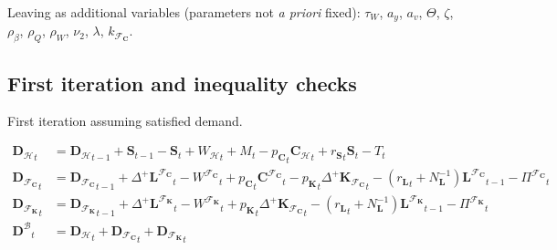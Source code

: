 \documentclass[a4paper, headings=standardclasses]{scrartcl}
\numberwithin{equation}{subsection}
\begin{document}
Leaving as additional variables (parameters not \textit{a priori} fixed): $\tau_W$, $a_y$, $a_v$, $\Theta$, $\zeta$, $\rho_\beta$, $\rho_Q$, $\rho_W$, $\nu_2$, $\lambda$, $k_{\mathcal{F}_\mathbf{C}}$.

\subsection{First iteration and inequality checks}
First iteration assuming satisfied demand.

{\allowdisplaybreaks \tiny
	\begin{align}
		{\mathbf{D}_\mathcal{H}}_t                        & = {\mathbf{D}_\mathcal{H}}_{t-1} + \mathbf{S}_{t-1} - \mathbf{S}_t + {W_\mathcal{H}} _t + M _t - {p_\mathbf{C}}_t {\mathbf{C}_\mathcal{H}}_t + {r_\mathbf{S}}_t \mathbf{S}_t - T_t                                           \\
		{\mathbf{D}_{\mathcal{F}_\mathbf{C}}}_t           & = {\mathbf{D}_{\mathcal{F}_\mathbf{C}}}_{t-1} + {\Delta^+{\mathbf{L}^{\mathcal{F}_\mathbf{C}}}}_t - {W^{\mathcal{F}_\mathbf{C}}}_t + {p_{\mathbf{C}}}_t {\mathbf{C}^{\mathcal{F}_\mathbf{C}}}_t - {p_{\mathbf{K}}}_t {\Delta^+{\mathbf{K}_{\mathcal{F}_\mathbf{C}}}}_t - ({r_\mathbf{L}}                                                                                                                                                                                                                                                                       _t + N_\mathbf{L}^{-1}) {\mathbf{L}^{\mathcal{F}_\mathbf{C}}}_{t-1} - {\Pi^{\mathcal{F}_\mathbf{C}}}_t \\
		{\mathbf{D}_{\mathcal{F}_\mathbf{K}}}_t           & =  {\mathbf{D}_{\mathcal{F}_\mathbf{K}}}_{t-1} + {\Delta^+{\mathbf{L}^{\mathcal{F}_\mathbf{K}}}}_t - {W^{\mathcal{F}_\mathbf{K}}}_t +  {p_{\mathbf{K}}}_t {\Delta^+{\mathbf{K}_{\mathcal{F}_\mathbf{C}}}}_t - ({r_\mathbf{L}}                                                                                                                                                                                                                                                                       _t + N_\mathbf{L}^{-1}) {\mathbf{L}^{\mathcal{F}_\mathbf{K}}}_{t-1} - {\Pi^{\mathcal{F}_\mathbf{K}}}_t \\
		{\mathbf{D}^\mathcal{B}}_t                        & = {\mathbf{D}_\mathcal{H}}_t + {\mathbf{D}_{\mathcal{F}_\mathbf{C}}}_t + {\mathbf{D}_{\mathcal{F}_\mathbf{K}}}_t                                                                                                                                                              \\

\end{align}}
\end{document}
